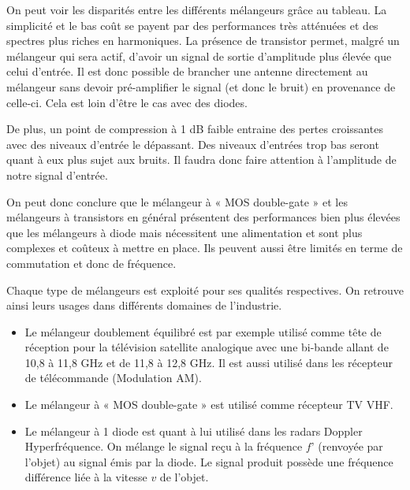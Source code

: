 \documentclass{article}
\begin{document}
On peut voir les disparités entre les différents mélangeurs grâce au tableau. La simplicité et le bas coût se payent par des performances très atténuées et des spectres plus riches en harmoniques. La présence de transistor permet, malgré un mélangeur qui sera actif, d'avoir un signal de sortie d'amplitude plus élevée que celui d'entrée. Il est donc possible de brancher une antenne directement au mélangeur sans devoir pré-amplifier le signal (et donc le bruit) en provenance de celle-ci. Cela est loin d'être le cas avec des diodes.

De plus, un point de compression à 1 dB faible entraine des pertes croissantes avec des niveaux d'entrée le dépassant. Des niveaux d'entrées trop bas seront quant à eux plus sujet aux bruits. Il faudra donc faire attention à l'amplitude de notre signal d'entrée.

On peut donc conclure que le mélangeur à « MOS double-gate » et les mélangeurs à transistors en général présentent des performances bien plus élevées que les mélangeurs à diode mais nécessitent une alimentation et sont plus complexes et coûteux à mettre en place. Ils peuvent aussi être limités en terme de commutation et donc de fréquence.



Chaque type de mélangeurs est exploité pour ses qualités respectives. On retrouve ainsi leurs usages dans différents domaines de l'industrie.

\begin{itemize}
\item Le mélangeur doublement équilibré est par exemple utilisé comme tête de réception pour la télévision satellite analogique avec une bi-bande allant de 10,8 à 11,8 GHz et de 11,8 à 12,8 GHz.
Il est aussi utilisé dans les récepteur de télécommande (Modulation AM).
\item Le mélangeur à « MOS double-gate » est utilisé comme récepteur TV VHF.
\item Le mélangeur à 1 diode est quant à lui utilisé dans les radars Doppler Hyperfréquence. On mélange le signal reçu à la fréquence $f’$ (renvoyée par l'objet) au signal émis par la diode. Le signal produit possède une fréquence différence liée à la vitesse $v$ de l'objet. 
\end{itemize}
\end{document}
